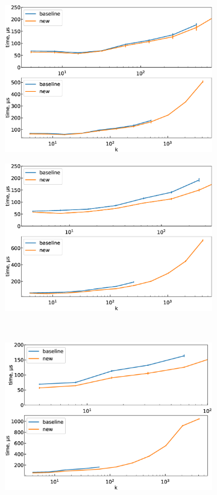 \documentclass[final,5p,twocolumn,times,authoryear]{elsarticle}
\begin{document}
\begin{figure}[t]
    \centering
	\begin{subfigure}[t]{0.46\textwidth}
        \includegraphics[width=0.93\linewidth]{boost_scale_fixed_0_25.eps}
        \caption{}\label{boost-scale-fixed_0_25}
	\end{subfigure}
	\quad
	\begin{subfigure}[t]{0.46\textwidth}
		\includegraphics[width=0.93\linewidth]{boost_scale_fixed_0_15.eps}
		\caption{}\label{boost-scale-fixed_0_15}
	\end{subfigure} \\
	\begin{subfigure}[t]{0.46\textwidth}
		\includegraphics[width=0.93\linewidth]{boost_scale_fixed_0_05.eps}

\end{subfigure}
\end{figure}
\end{document}
